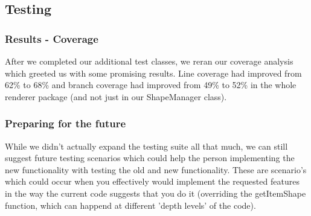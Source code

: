 \documentclass{article}
\begin{document}
\subsection{Testing}

\subsubsection{Results - Coverage}

After we completed our additional test classes, we reran our coverage analysis which greeted us with some promising results. Line coverage had improved from 62\% to 68\% and branch coverage had improved from 49\% to 52\% in the whole renderer package (and not just in our ShapeManager class).

\subsubsection{Preparing for the future}

While we didn't actually expand the testing suite all that much, we can still suggest future testing scenarios which could help the person implementing the new functionality with testing the old and new functionality. These are scenario's which could occur when you effectively would implement the requested features in the way the current code suggests that you do it (overriding the getItemShape function, which can happend at different 'depth levels' of the code).\\
\end{document}
